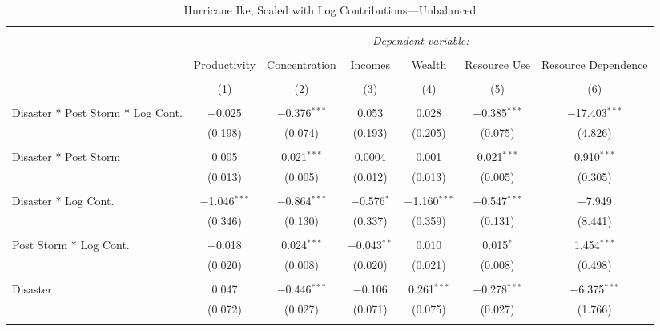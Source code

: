 
\begin{table}[!htbp] \centering 
  \caption{Hurricane Ike, Scaled with Log Contributions---Unbalanced} 
  \label{} 
\footnotesize 
\begin{tabular}{@{\extracolsep{5pt}}lcccccc} 
\\[-1.8ex]\hline 
\hline \\[-1.8ex] 
 & \multicolumn{6}{c}{\textit{Dependent variable:}} \\ 
\cline{2-7} 
\\[-1.8ex] & Productivity & Concentration & Incomes & Wealth & Resource Use & Resource Dependence \\ 
\\[-1.8ex] & (1) & (2) & (3) & (4) & (5) & (6)\\ 
\hline \\[-1.8ex] 
 Disaster * Post Storm * Log Cont. & $-$0.025 & $-$0.376$^{***}$ & 0.053 & 0.028 & $-$0.385$^{***}$ & $-$17.403$^{***}$ \\ 
  & (0.198) & (0.074) & (0.193) & (0.205) & (0.075) & (4.826) \\ 
  & & & & & & \\ 
 Disaster * Post Storm & 0.005 & 0.021$^{***}$ & 0.0004 & 0.001 & 0.021$^{***}$ & 0.910$^{***}$ \\ 
  & (0.013) & (0.005) & (0.012) & (0.013) & (0.005) & (0.305) \\ 
  & & & & & & \\ 
 Disaster * Log Cont. & $-$1.046$^{***}$ & $-$0.864$^{***}$ & $-$0.576$^{*}$ & $-$1.160$^{***}$ & $-$0.547$^{***}$ & $-$7.949 \\ 
  & (0.346) & (0.130) & (0.337) & (0.359) & (0.131) & (8.441) \\ 
  & & & & & & \\ 
 Post Storm *  Log Cont. & $-$0.018 & 0.024$^{***}$ & $-$0.043$^{**}$ & 0.010 & 0.015$^{*}$ & 1.454$^{***}$ \\ 
  & (0.020) & (0.008) & (0.020) & (0.021) & (0.008) & (0.498) \\ 
  & & & & & & \\ 
 Disaster & 0.047 & $-$0.446$^{***}$ & $-$0.106 & 0.261$^{***}$ & $-$0.278$^{***}$ & $-$6.375$^{***}$ \\ 
  & (0.072) & (0.027) & (0.071) & (0.075) & (0.027) & (1.766) \\ 
  & & & & & & \\ 

\end{tabular}
\end{table}
